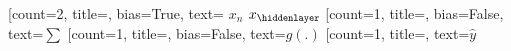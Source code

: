 \documentclass[convert={density=300,size=1080x800,outext=.png}]{standalone}
\begin{document}
\begin{neuralnetwork}[height=1,maintitleheight=1cm,layertitleheight=2cm, layerspacing=50]
  \newcommand{\textinput}[2]{\ifnum #2=3 $x_n$ \else $x_#2$ \fi}
  \newcommand{\textactivation}[2]{$g(.)$}
  \newcommand{\textsum}[2]{$\sum$}
  \newcommand{\textout}[2]{$\hat{y}$}
  
  \newcommand{\w}[4] {\ifnum #2=0 $1$ \else \ifnum #2=1 $3$ \else -2 \fi \fi}
  \newcommand{\ws}[4] {}
  \setdefaultlinklabel{\w}

  [count=2, title={}, bias=True, text=\textinput]
  \hiddenlayer[count=1, title={}, bias=False, text=\textsum]
  \linklayers
  \hiddenlayer[count=1, title={}, bias=False, text=\textactivation]
  \setdefaultlinklabel{\ws}
  \linklayers
  \outputlayer[count=1, title={}, text=\textout] 
  \linklayers
  
\end{neuralnetwork}
\end{document}
